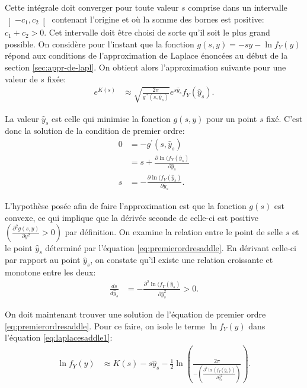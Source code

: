 Cette intégrale doit converger pour toute valeur $s$ comprise dans un
intervalle $\left]-c_1,c_2\right[$ contenant l'origine et où la somme
des bornes est positive: $c_1+c_2 > 0$. Cet intervalle doit être
choisi de sorte qu'il soit le plus grand possible. On considère pour
l'instant que la fonction $g( s,y) = - s y - \ln{f_Y(y)}$ répond aux
conditions de l'approximation de Laplace énoncées au début de la
section \ref{sec:appr-de-lapl}. On obtient alors l'approximation
suivante pour une valeur de $s$ fixée:
\begin{align}
  \label{eq:laplacesaddle1}
  e^{K(s)} &\approx \sqrt{\frac{2\pi}{g^{\prime\prime}( s,\hat{y}_{
        s})}}e^{ s \hat{y}_{ s}} f_Y(\hat{y}_{ s}).
\end{align}

La valeur $\hat{y}_{s}$ est celle qui minimise la fonction $g(s,y)$
pour un point $s$ fixé. C'est donc la solution de la condition de
premier ordre:
\begin{align}
  0 &= -g^{\prime}( s,\hat{y}_{ s}) \nonumber\\
  &=  s + \frac{\partial \ln{(f_Y(\hat{y}_{ s})}}{\partial \hat{y}_{ s}} \nonumber\\
  s &= - \frac{\partial \ln{(f_Y(\hat{y}_{ s})}}{\partial \hat{y}_{
      s}}. \label{eq:premierordresaddle}
\end{align}

L'hypothèse posée afin de faire l'approximation est que la fonction
$g(s)$ est convexe, ce qui implique que la dérivée seconde de celle-ci
est positive $(\frac{\partial^2g( s,y)}{\partial y^2} > 0)$ par
définition. On examine la relation entre le point de selle $s$ et le
point $\hat{y}_{ s}$ déterminé par l'équation
\eqref{eq:premierordresaddle}. En dérivant celle-ci par rapport au
point $\hat{y}_{ s}$, on constate qu'il existe une relation croissante
et monotone entre les deux:
\begin{align}
  \label{eq:secondordresaddle}
  \frac{d s}{d\hat{y}_{ s}} &= - \frac{\partial^2 \ln{(f_Y(\hat{y}_{
        s})}}{\partial \hat{y}_{ s}^2} > 0.
\end{align}

On doit maintenant trouver une solution de l'équation de premier ordre
\eqref{eq:premierordresaddle}. Pour ce faire, on isole le terme
$\ln{f_Y(y)}$ dans l'équation \eqref{eq:laplacesaddle1}:
\begin{align}
  \label{eq:lnfysaddlelaplace}
  \ln{f_Y(y)} & \approx K( s) - s \hat{y}_{ s} - \frac{1}{2}
  \ln{\left(\frac{2\pi}{-\left(\frac{\partial^2 \ln{(f_Y(\hat{y}_{
                s}))}}{\partial \hat{y}_{ s}^2}\right)}\right)}.
\end{align}

